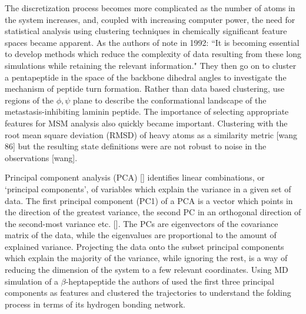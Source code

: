 The discretization process becomes more complicated as the number of atoms in the system increases, and, coupled with increasing computer power, the need for statistical analysis using clustering techniques in chemically significant feature spaces became apparent. As the authors of \cite{karpen1993statistical} note in 1992: 
``It is becoming essential to develop methods which reduce the complexity of data resulting from these long simulations while retaining the relevant information."
They then go on to cluster a pentapeptide in the space of the backbone dihedral angles to investigate the mechanism of peptide turn formation. Rather than data based clustering, \cite{mckelveyCHARMMAnalysisConformations1991} use regions of the $\phi, \psi$ plane to describe the conformational landscape of the metastasis-inhibiting laminin peptide. The importance of selecting appropriate features for MSM analysis also quickly became important.  Clustering with the root mean square deviation (RMSD) of heavy atoms as a similarity metric [wang 86] but the resulting state definitions were are not robust to noise in the observations [wang].  

Principal component analysis (PCA) [] identifies linear combinations, or `principal components', of variables which explain the variance in a given set of data. The first principal component (PC1) of a PCA  is a vector which points in the direction of the greatest variance, the second PC in an orthogonal direction of the second-most variance etc. []. The PCs are eigenvectors of the covariance matrix of the data, while the eigenvalues are proportional to the amount of explained variance. Projecting the data onto the subset principal components which explain the majority of the variance, while ignoring the rest, is a way of reducing the dimension of the system to a few relevant coordinates. Using MD simulation of a $\beta$-heptapeptide the authors of \cite{degrootEssentialDynamicsReversible2001} used the first three principal components as features and clustered the trajectories to understand the folding process in terms of its hydrogen bonding network. 

